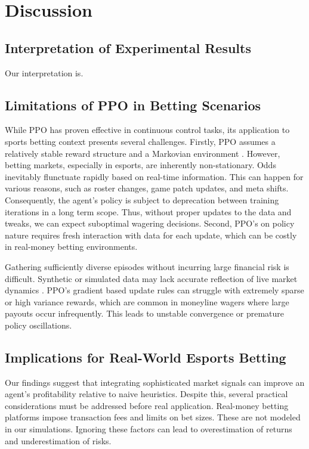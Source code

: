 \documentclass[sigconf]{acmart}
\begin{document}
\section{Discussion}

\subsection{Interpretation of Experimental Results}

Our interpretation is.

\subsection{Limitations of PPO in Betting Scenarios}

While PPO has proven effective in continuous control tasks, its application to sports betting context presents several challenges. Firstly, PPO assumes a relatively stable reward structure and a Markovian environment \cite{schulman2017ppo}. However, betting markets, especially in esports, are inherently non-stationary. Odds inevitably flunctuate rapidly based on real-time information. This can happen for various reasons, such as roster changes, game patch updates, and meta shifts. Consequently, the agent's policy is subject to deprecation between training iterations in a long term scope. Thus, without proper updates to the data and tweaks, we can expect suboptimal wagering decisions. Second, PPO's on policy nature requires fresh interaction with data for each update, which can be costly in real-money betting environments.

Gathering sufficiently diverse episodes without incurring large financial risk is difficult. Synthetic or simulated data may lack accurate reflection of live market dynamics \cite{jansen2020rlbetting}. PPO's gradient based update rules can struggle with extremely sparse or high variance rewards, which are common in moneyline wagers where large payouts occur infrequently. This leads to unstable convergence or premature policy oscillations. 

\subsection{Implications for Real-World Esports Betting}

Our findings suggest that integrating sophisticated market signals can improve an agent's profitability relative to naive heuristics. Despite this, several practical considerations must be addressed before real application. Real-money betting platforms impose transaction fees and limits on bet sizes. These are not modeled in our simulations. Ignoring these factors can lead to overestimation of returns and underestimation of risks.
\end{document}
